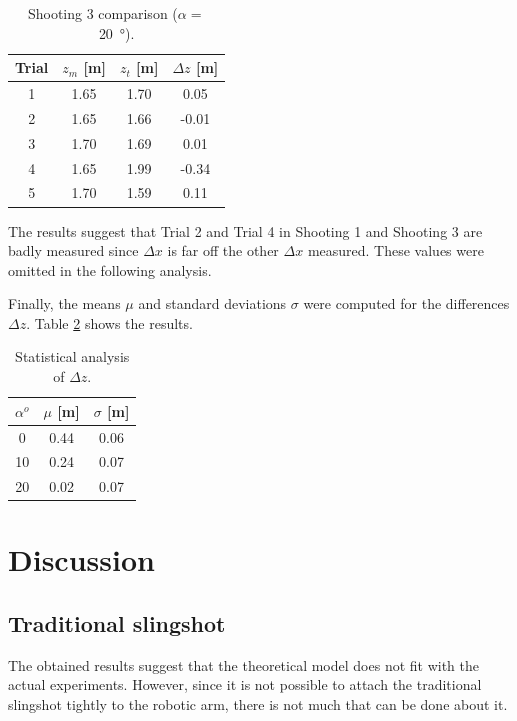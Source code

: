 			\begin{table}\centering
			\begin{tabular}{@{}cccc@{}}\toprule
			Trial & $ z_m$ [m] & $z_t$ [m] & $\Delta z$ [m] \\ \midrule

			1 & 1.65 & 1.70 & 0.05 \\
			2 & 1.65 & 1.66 & -0.01 \\
			3 & 1.70 & 1.69 & 0.01 \\
			4 & 1.65 & 1.99 & -0.34 \\
			5 & 1.70 & 1.59 & 0.11 \\
		
			\bottomrule
			\end{tabular}
			\caption{Shooting 3 comparison ($\alpha = $ \SI{20}{\degree}).}
			\label{table: exp comparison 3}
			\end{table}

			The results suggest that Trial 2 and Trial 4 in Shooting 1 and Shooting 3 are badly measured since $\Delta x$ is far off the other $\Delta x$ measured. These values were omitted in the following analysis.

			Finally, the means $\mu$ and standard deviations $\sigma$ were computed for the differences $ \Delta z$. Table \ref{table: exp analysis} shows the results.

			\begin{table}\centering
			\begin{tabular}{@{}ccc@{}}\toprule
			$\alpha^{o}$ & $\mu$ [m] & $\sigma$ [m]\\ \midrule

			0 & 0.44 & 0.06 \\
			10 & 0.24 & 0.07 \\
			20 & 0.02 & 0.07 \\
			
			\bottomrule
			\end{tabular}
			\caption{Statistical analysis of $\Delta z$.}
			\label{table: exp analysis}
			\end{table}

	\section{Discussion}

		\subsection{Traditional slingshot}
			The obtained results suggest that the theoretical model does not fit with the actual experiments. However, since it is not possible to attach the traditional slingshot tightly to the robotic arm, there is not much that can be done about it.

